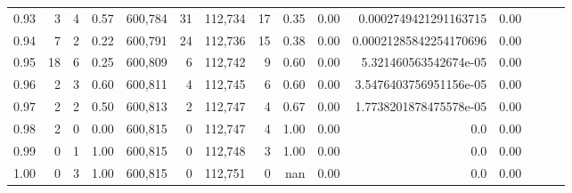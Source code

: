 \begin{tabular}{rrrrrrrrrrrrrrr}
0.93 &       3 &      4 &  0.57 &  600,784 &       31 &  112,734 &       17 &  0.35 &  0.00 &   0.0002749421291163715 &      0.00 \\
0.94 &       7 &      2 &  0.22 &  600,791 &       24 &  112,736 &       15 &  0.38 &  0.00 &  0.00021285842254170696 &      0.00 \\
0.95 &      18 &      6 &  0.25 &  600,809 &        6 &  112,742 &        9 &  0.60 &  0.00 &   5.321460563542674e-05 &      0.00 \\
0.96 &       2 &      3 &  0.60 &  600,811 &        4 &  112,745 &        6 &  0.60 &  0.00 &  3.5476403756951156e-05 &      0.00 \\
0.97 &       2 &      2 &  0.50 &  600,813 &        2 &  112,747 &        4 &  0.67 &  0.00 &  1.7738201878475578e-05 &      0.00 \\
0.98 &       2 &      0 &  0.00 &  600,815 &        0 &  112,747 &        4 &  1.00 &  0.00 &                     0.0 &      0.00 \\
0.99 &       0 &      1 &  1.00 &  600,815 &        0 &  112,748 &        3 &  1.00 &  0.00 &                     0.0 &      0.00 \\
1.00 &       0 &      3 &  1.00 &  600,815 &        0 &  112,751 &        0 &   nan &  0.00 &                     0.0 &      0.00 \\
\bottomrule
\end{tabular}
